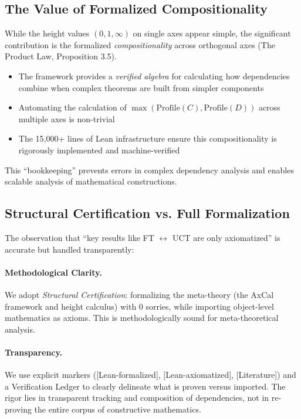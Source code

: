 \documentclass[11pt]{article}
\theoremstyle{plain}
\theoremstyle{definition}
\newcommand{\leanok}{\textsf{\textcolor{green!70!black}{[Lean-formalized]}}}
\newcommand{\leanaxiom}{\textsf{\textcolor{orange!80!black}{[Lean-axiomatized]}}}
\newcommand{\leancited}{\textsf{\textcolor{blue!70!black}{[Literature]}}}
\begin{document}
\subsection{The Value of Formalized Compositionality}

While the height values $(0, 1, \infty)$ on single axes appear simple, the significant contribution is the formalized \emph{compositionality} across orthogonal axes (The Product Law, Proposition 3.5).

\begin{itemize}
\item The framework provides a \emph{verified algebra} for calculating how dependencies combine when complex theorems are built from simpler components
\item Automating the calculation of $\max(\mathrm{Profile}(C), \mathrm{Profile}(D))$ across multiple axes is non-trivial
\item The 15,000+ lines of Lean infrastructure ensure this compositionality is rigorously implemented and machine-verified
\end{itemize}

This ``bookkeeping'' prevents errors in complex dependency analysis and enables scalable analysis of mathematical constructions.

\subsection{Structural Certification vs. Full Formalization}

The observation that ``key results like FT $\leftrightarrow$ UCT are only axiomatized'' is accurate but handled transparently:

\paragraph{Methodological Clarity.} We adopt \emph{Structural Certification}: formalizing the meta-theory (the AxCal framework and height calculus) with 0 sorries, while importing object-level mathematics as axioms. This is methodologically sound for meta-theoretical analysis.

\paragraph{Transparency.} We use explicit markers (\leanok, \leanaxiom, \leancited) and a Verification Ledger to clearly delineate what is proven versus imported. The rigor lies in transparent tracking and composition of dependencies, not in re-proving the entire corpus of constructive mathematics.
\end{document}
